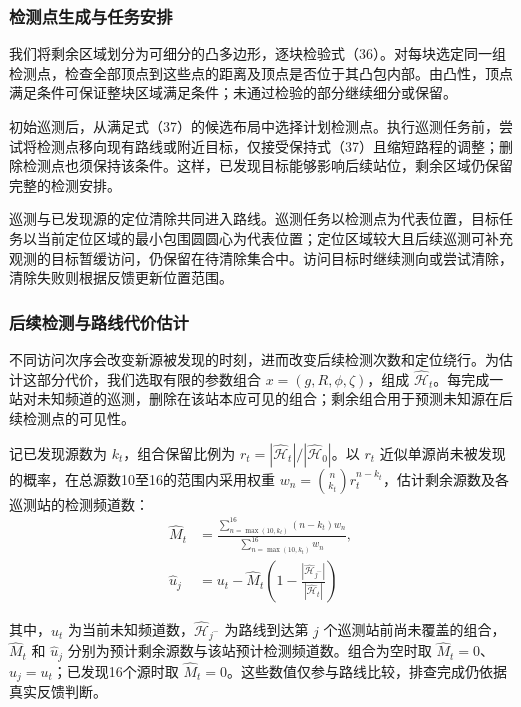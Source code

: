 \subsubsection{检测点生成与任务安排}

我们将剩余区域划分为可细分的凸多边形，逐块检验式（36）。对每块选定同一组检测点，检查全部顶点到这些点的距离及顶点是否位于其凸包内部。由凸性，顶点满足条件可保证整块区域满足条件；未通过检验的部分继续细分或保留。

初始巡测后，从满足式（37）的候选布局中选择计划检测点。执行巡测任务前，尝试将检测点移向现有路线或附近目标，仅接受保持式（37）且缩短路程的调整；删除检测点也须保持该条件。这样，已发现目标能够影响后续站位，剩余区域仍保留完整的检测安排。

巡测与已发现源的定位清除共同进入路线。巡测任务以检测点为代表位置，目标任务以当前定位区域的最小包围圆圆心为代表位置；定位区域较大且后续巡测可补充观测的目标暂缓访问，仍保留在待清除集合中。访问目标时继续测向或尝试清除，清除失败则根据反馈更新位置范围。

\subsubsection{后续检测与路线代价估计}

不同访问次序会改变新源被发现的时刻，进而改变后续检测次数和定位绕行。为估计这部分代价，我们选取有限的参数组合 \(x=(g,R,\phi,\zeta)\)，组成 \(\widehat{\mathcal H}_t\)。每完成一站对未知频道的巡测，删除在该站本应可见的组合；剩余组合用于预测未知源在后续检测点的可见性。

记已发现源数为 \(k_t\)，组合保留比例为 \(r_t=|\widehat{\mathcal H}_t|/|\widehat{\mathcal H}_0|\)。以 \(r_t\) 近似单源尚未被发现的概率，在总源数10至16的范围内采用权重 \(w_n=\binom n{k_t}r_t^{n-k_t}\)，估计剩余源数及各巡测站的检测频道数：
\[
\begin{aligned}
\widehat M_t&=
\frac{\displaystyle\sum_{n=\max(10,k_t)}^{16}(n-k_t)w_n}
{\displaystyle\sum_{n=\max(10,k_t)}^{16}w_n},\\
\widehat u_j&=u_t-\widehat M_t\left(1-\frac{|\widehat{\mathcal H}_{j^-}|}{|\widehat{\mathcal H}_t|}\right)
\end{aligned}
\tag{38}
\]

其中，\(u_t\) 为当前未知频道数，\(\widehat{\mathcal H}_{j^-}\) 为路线到达第 \(j\) 个巡测站前尚未覆盖的组合，\(\widehat M_t\) 和 \(\widehat u_j\) 分别为预计剩余源数与该站预计检测频道数。组合为空时取 \(\widehat M_t=0\)、\(\widehat u_j=u_t\)；已发现16个源时取 \(\widehat M_t=0\)。这些数值仅参与路线比较，排查完成仍依据真实反馈判断。


